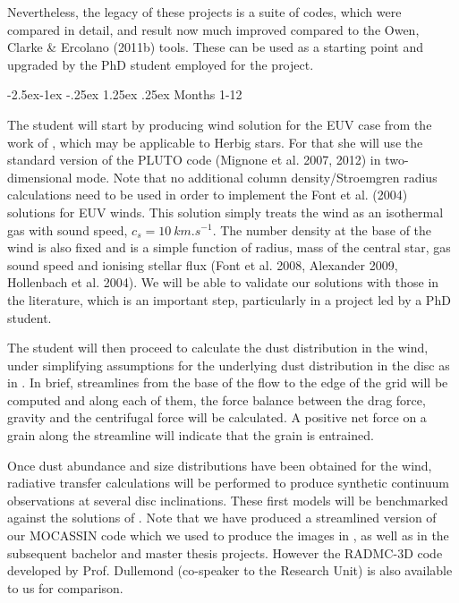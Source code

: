 \documentclass[10pt,fleqn,twoside]{article}
\makeatletter
\renewcommand\paragraph{\@startsection{paragraph}{4}{\z@}%
            {-2.5ex\@plus -1ex \@minus -.25ex}%
            {1.25ex \@plus .25ex}%
            {\normalfont\normalsize\bfseries}}
\makeatother
\begin{document}
 Nevertheless, the legacy of these projects is a suite of
codes, which were compared in detail, and result now much improved
compared to the Owen, Clarke \& Ercolano (2011b) tools. These can be
used as a starting point and upgraded by the PhD student employed for the project.  


\paragraph{Months 1-12}

The student will start by producing wind solution for the EUV case
from the work of \citet{2004ApJ...607..890F}, which may be applicable
to Herbig stars. For that she will use the standard version of the
PLUTO code (Mignone et al. 2007, 2012) in
two-dimensional mode. Note that no additional column density/Stroemgren radius
calculations need to be used in order to implement the Font et
al. (2004) solutions for EUV winds. This solution simply treats the
wind as an isothermal gas with sound speed, $c_s =
\SI{10}{km.s^{-1}}$.
The number density at the base of the wind is also fixed and is a simple
function of radius, mass of the central star, gas sound speed and
ionising stellar flux (Font et al. 2008, Alexander 2009, Hollenbach et
al. 2004). We will be able to validate our solutions with those in the
literature, which is an important step, particularly in a project led
by a PhD student. 

The student will then proceed to calculate the dust
distribution in the wind, under simplifying assumptions for the
underlying dust distribution in the disc as in \citet{2011MNRAS.411.1104O}. In
brief, streamlines from the base of the flow to the edge of the grid
will be computed and along each of them, the force balance between the
drag force, gravity and the centrifugal force will be calculated. A
positive net force on a grain along the streamline will indicate that
the grain is entrained.

Once dust abundance and size distributions have been obtained for the
wind, radiative transfer calculations will be performed to produce
synthetic continuum observations at several disc inclinations. 
These first models will be benchmarked against the solutions
of \citet{2011MNRAS.411.1104O}. Note that we have produced a
streamlined version of our MOCASSIN code which we used to produce the
images in \citet{2011MNRAS.411.1104O}, as well as in the subsequent
bachelor and master thesis projects. However the RADMC-3D code
developed by Prof. Dullemond (co-speaker to the Research Unit) is also
available to us for comparison. 
\end{document}
